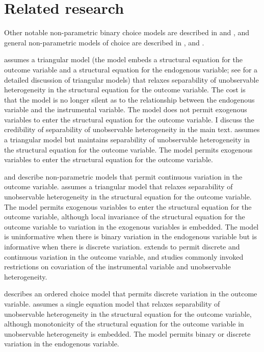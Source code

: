 \documentclass[12pt,a4paper,twoside]{article}
\numberwithin{equation}{section}
\begin{document}
\section*{Related research}
Other notable non-parametric binary choice models are described in \cite{bp97} and \cite{sHvY11}, and general non-parametric models of choice are described in \cite{c05}, \cite{kI09} and \cite{c10}.

\cite{bp97} assumes a triangular model (the model embeds a structural equation for the outcome variable and a structural equation for the endogenous variable; see \cite{sTw60} for a detailed discussion of triangular models) that relaxes separability of unobservable heterogeneity in the structural equation for the outcome variable. The cost is that the model is no longer silent as to the relationship between the endogenous variable and the instrumental variable. The model does not permit exogenous variables to enter the structural equation for the outcome variable. I discuss the credibility of separability of unobservable heterogeneity in the main text. \cite{sHvY11} assumes a triangular model but maintains separability of unobservable heterogeneity in the structural equation for the outcome variable. The model permits exogenous variables to enter the structural equation for the outcome variable.

\cite{c05} and \cite{kI09} describe non-parametric models that permit continuous variation in the outcome variable. \cite{c05} assumes a triangular model that relaxes separability of unobservable heterogeneity in the structural equation for the outcome variable. The model permits exogenous variables to enter the structural equation for the outcome variable, although local invariance of the structural equation for the outcome variable to variation in the exogenous variables is embedded. The model is uninformative when there is binary variation in the endogenous variable but is informative when there is discrete variation. \cite{kI09} extends \cite{bp97} to permit discrete and continuous variation in the outcome variable, and studies commonly invoked restrictions on covariation of the instrumental variable and unobservable heterogeneity.

\cite{c10} describes an ordered choice model that permits discrete variation in the outcome variable. \cite{c10} assumes a single equation model that relaxes separability of unobservable heterogeneity in the structural equation for the outcome variable, although monotonicity of the structural equation for the outcome variable in unobservable heterogeneity is embedded. The model permits binary or discrete variation in the endogenous variable.
\end{document}
